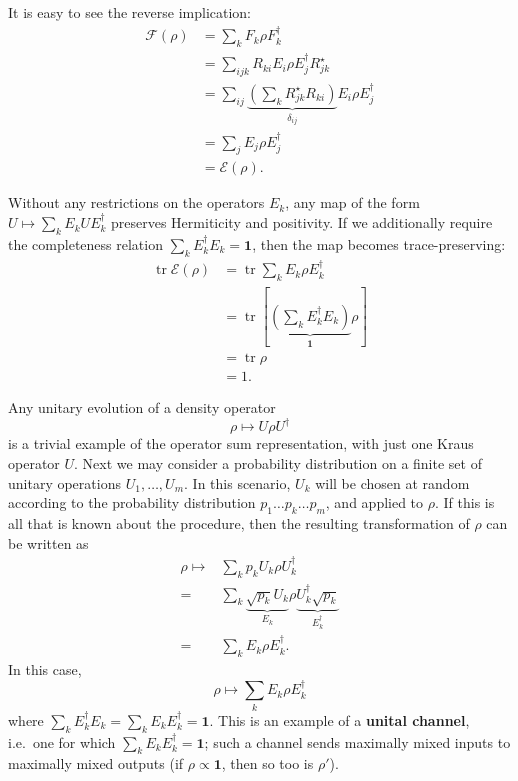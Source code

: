 \documentclass[fleqn]{article}
\renewcommand{\footnote}[1]{\en{#1}}
\begin{document}
It is easy to see the reverse implication:
\[
  \begin{aligned}
    \mathcal{F}(\rho)
    &=\sum_k F_k\rho F^\dagger_k
  \\&= \sum_{ijk} R_{ki}E_i \rho E^\dagger_j R^\star_{jk}
  \\&=\sum_{ij} \underbrace{\left(\sum_k R_{jk}^\star R_{ki}\right)}_{\delta_{ij}} E_i\rho E^\dagger_j
  \\&= \sum_j E_j\rho E^\dagger_j
  \\&= \mathcal{E} (\rho).
  \end{aligned}
\]

Without any restrictions on the operators \(E_k\), any map of the form \(U\mapsto\sum_k E_k U E_k^\dagger\) preserves Hermiticity and positivity.\footnote{Prove this!}
If we additionally require the completeness relation \(\sum_k E_k^\dagger E_k=\mathbf{1}\), then the map becomes trace-preserving:
\[
  \begin{aligned}
    \operatorname{tr}\mathcal{E}(\rho)
    &= \operatorname{tr}\sum_k E_k\rho E_k^\dagger
  \\&= \operatorname{tr}\left[\underbrace{\left(\sum_k E^\dagger_k E_k\right)}_{\mathbf{1}} \rho\right]
  \\&= \operatorname{tr}\rho
  \\&= 1.
  \end{aligned}
\]

Any unitary evolution of a density operator
\[
  \rho \longmapsto U\rho U^\dagger
\]
is a trivial example of the operator sum representation, with just one Kraus operator \(U\).
Next we may consider a probability distribution on a finite set of unitary operations \(U_1,\ldots, U_m\).
In this scenario, \(U_k\) will be chosen at random according to the probability distribution \(p_1\ldots p_k \ldots p_m\), and applied to \(\rho\).
If this is all that is known about the procedure, then the resulting transformation of \(\rho\) can be written as
\[
  \begin{aligned}
    \rho\longmapsto
    &\sum_k p_k U_k\rho U_k^\dagger
  \\=&\sum_k  \underbrace{\sqrt{p_k} U_k}_{E_k}  \rho \underbrace{U_k^\dagger\sqrt{p_k}}_{E_k^\dagger}
  \\=&\sum_k E_k\rho E^\dagger_k.
  \end{aligned}
\]
In this case,
\[
  \rho\longmapsto \sum_k E_k\rho E_k^\dagger
\]
where \(\sum_k E_k^\dagger E_k = \sum_k E_k E^\dagger_k =\mathbf{1}\).
This is an example of a \textbf{unital channel}, i.e.~one for which \(\sum_k E_k E^\dagger_k =\mathbf{1}\); such a channel sends maximally mixed inputs to maximally mixed outputs (if \(\rho \propto \mathbf{1}\), then so too is \(\rho'\)).
\end{document}
